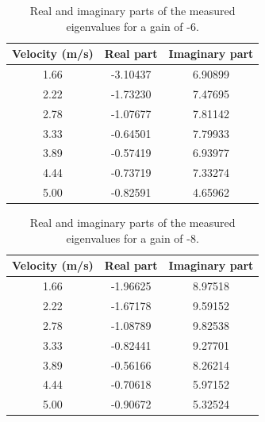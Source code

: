 \documentclass[12pt]{article}
\begin{document}
\begin{table}[]
    \centering
    \caption{Real and imaginary parts of the measured eigenvalues for a gain of -6.}
    \label{table-eigenvalues-gain-6}
    \begin{tabular}{c|c|c}
        \textbf{Velocity (m/s)} & \textbf{Real part} & \textbf{Imaginary part} \\ \hline
        1.66                    & -3.10437           & 6.90899                 \\
        2.22                    & -1.73230           & 7.47695                 \\
        2.78                    & -1.07677           & 7.81142                 \\
        3.33                    & -0.64501           & 7.79933                 \\
        3.89                    & -0.57419           & 6.93977                 \\
        4.44                    & -0.73719           & 7.33274                 \\
        5.00                    & -0.82591           & 4.65962
    \end{tabular}
\end{table}

\begin{table}[]
    \centering
    \caption{Real and imaginary parts of the measured eigenvalues for a gain of -8.}
    \label{table-eigenvalues-gain-8}
    \begin{tabular}{c|c|c}
        \textbf{Velocity (m/s)} & \textbf{Real part} & \textbf{Imaginary part} \\ \hline
        1.66                    & -1.96625           & 8.97518                 \\
        2.22                    & -1.67178           & 9.59152                 \\
        2.78                    & -1.08789           & 9.82538                 \\
        3.33                    & -0.82441           & 9.27701                 \\
        3.89                    & -0.56166           & 8.26214                 \\
        4.44                    & -0.70618           & 5.97152                 \\
        5.00                    & -0.90672           & 5.32524
    \end{tabular}
\end{table}
\end{document}
